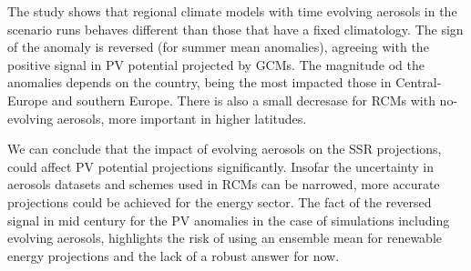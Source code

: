 

The study shows that regional climate models with time evolving aerosols in the scenario runs behaves different than those that have a fixed climatology. The sign of the anomaly is reversed (for summer mean anomalies), agreeing with the positive signal in PV potential projected by GCMs. The magnitude od the anomalies depends on the country, being the most impacted those in Central-Europe and southern Europe. There is also a small decresase for RCMs with no-evolving aerosols, more important in higher latitudes. 

We can conclude that the impact of evolving aerosols on the SSR projections, could affect PV potential projections significantly. Insofar the uncertainty in aerosols datasets and schemes used in RCMs can be narrowed, more accurate projections could be achieved for the energy sector. The fact of the reversed signal in mid century for the PV anomalies in the case of simulations including evolving aerosols, highlights the risk of using an ensemble mean for renewable energy projections and the lack of a robust answer for now.   


